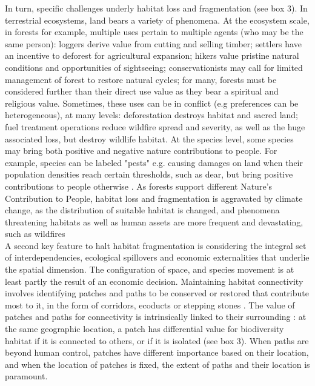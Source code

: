 In turn, specific challenges underly habitat loss and fragmentation (see box 3). In terrestrial ecosystems, land bears a variety of phenomena. At the ecosystem scale, in forests for example, multiple uses pertain to multiple agents (who may be the same person): loggers derive value from cutting and selling timber; settlers have an incentive to deforest for agricultural expansion; hikers value pristine natural conditions and opportunities of sightseeing; conservationists may call for limited management of forest to restore natural cycles; for many, forests must be considered further than their direct use value as they bear a spiritual and religious value. Sometimes, these uses can be in conflict (e.g preferences can be heterogeneous), at many levels: deforestation destroys habitat and sacred land; fuel treatment operations reduce wildfire spread and severity, as well as the huge associated loss, but destroy wildlife habitat. At the species level, some species may bring both positive and negative nature contributions to people. For example, species can be labeled "pests" e.g. causing damages on land when their population densities reach certain thresholds, such as dear, but bring positive contributions to people otherwise \citep{putman_identifying_2011}. As forests support different Nature's Contribution to People, habitat loss and fragmentation is aggravated by climate change, as the distribution of suitable habitat is changed, and phenomena threatening habitats as well as human assets are more frequent and devastating, such as wildfires \citep{Dupuy2019ClimateCI,wasserman_climate_2023}
\\
A second key feature to halt habitat fragmentation is considering the integral set of interdependencies, ecological spillovers and economic externalities that underlie the spatial dimension. The configuration of space, and species movement is at least partly the result of an economic decision. Maintaining habitat connectivity involves identifying patches and paths to be conserved or restored that contribute most to it, in the form of corridors, ecoducts or stepping stones \citep{Turner2005, Turner2011}. The value of patches and paths for connectivity is intrinsically linked to their surrounding : at the same geographic location, a patch has differential value for biodiversity habitat if it is connected to others, or if it is isolated (see box 3). When paths are beyond human control, patches have different importance based on their location, and when the location of patches is fixed, the extent of paths and their location is paramount.
